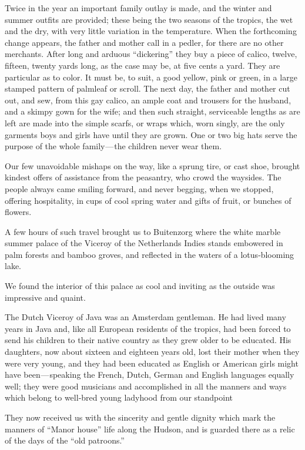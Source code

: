 \documentclass[12pt]{book}
\begin{document}
Twice in the year an important family outlay is made, and the winter and
summer outfits are provided; these being the two seasons of the tropics, the wet
and the dry, with very little variation in the temperature. When the forthcoming
change appears, the father and mother call in a pedler, for there are no other
merchants. After long and arduous “dickering” they buy a piece of calico, twelve,
fifteen, twenty yards long, as the case may be, at five cents a yard. They are
particular as to color. It must be, to suit, a good yellow, pink or green, in a large
stamped pattern of palmleaf or scroll. The next day, the father and mother cut
out, and sew, from this gay calico, an ample coat and trousers for the husband,
and a skimpy gown for the wife; and then such straight, serviceable lengths as
are left are made into the simple scarfs, or wraps which, worn singly, are the only
garments boys and girls have until they are grown. One or two big hats serve the
purpose of the whole family — the children never wear them.

Our few unavoidable mishaps on the way, like a sprung tire, or cast shoe,
brought kindest offers of assistance from the peasantry, who crowd the waysides.
The people always came smiling forward, and never begging, when we stopped,
offering hospitality, in cups of cool spring water and gifts of fruit, or bunches of
flowers.

A few hours of such travel brought us to Buitenzorg where the white marble
summer palace of the Viceroy of the Netherlands Indies stands embowered in
palm forests and bamboo groves, and reflected in the waters of a lotus‐blooming
lake.

We found the interior of this palace as cool and inviting as the outside was
impressive and quaint.

The Dutch Viceroy of Java was an Amsterdam gentleman. He had lived many
years in Java and, like all European residents of the tropics, had been forced to
send his children to their native country as they grew older to be educated. His
daughters, now about sixteen and eighteen years old, lost their mother when they
were very young, and they had been educated as English or American girls might
have been — speaking the French, Dutch, German and English languages equally
well; they were good musicians and accomplished in all the manners and ways
which belong to well‐bred young ladyhood from our standpoint

They now received us with the sincerity and gentle dignity which mark the
manners of “Manor house” life along the Hudson, and is guarded there as a relic
of the days of the “old patroons.”
\end{document}
